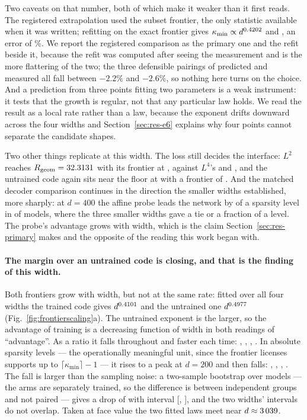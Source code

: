 \documentclass[preprint,12pt]{elsarticle}
\theoremstyle{definition}
\begin{document}
Two caveats on that number, both of which make it weaker than it first reads. The registered
extrapolation used the subset frontier, the only statistic available when it was written; refitting
on the exact frontier gives $\kappa_{\min}\propto d^{0.4202}$ and \ScPredicted{}, an error of
\ScPredErrorPct\%. We report the registered comparison as the primary one and the refit beside it,
because the refit was computed after seeing the measurement and is the more flattering of the two;
the three defensible pairings of predicted and measured all fall between $-2.2\%$ and $-2.6\%$, so
nothing here turns on the choice. And a prediction from three points fitting two parameters is a
weak instrument: it tests that the growth is regular, not that any particular law holds. We read the
result as a local rate rather than a law, because the exponent drifts downward across the four widths
and Section~\ref{sec:res-e6} explains why four points cannot separate the candidate shapes.

Two other things replicate at this width. The loss still decides the interface: $L^2$ reaches
$R_{\mathrm{geom}}=32.3131$ with its frontier at \ScLtwoKappa, against $L^4$'s
\ScLfourRgeom{} and \ScLfourKappa{}, and the untrained code again sits near the floor at
\ScRandRgeom{} with a frontier of \ScRandKappa{}. And the matched decoder comparison continues in the direction the smaller widths
established, more sharply: at $d=400$ the affine probe leads the network by \ScPrimDiff{} of a
sparsity level in \ScPrimProbeWins{} of \ScSeeds{} models, where the three smaller widths gave a tie
or a fraction of a level. The probe's advantage grows with width, which is the claim
Section~\ref{sec:res-primary} makes and the opposite of the reading this work began with.

\paragraph{The margin over an untrained code is closing, and that is the finding of this width.}
Both frontiers grow with width, but not at the same rate: fitted over all four widths the trained
code gives $d^{0.4101}$ and the untrained one $d^{0.4977}$
(Fig.~\ref{fig:frontierscaling}a). The untrained exponent is the larger, so the advantage of training
is a decreasing function of width in both readings of ``advantage''. As a ratio it falls throughout
and faster each time: \MarginFiftyRatio, \MarginHundredRatio, \MarginTwoHundredRatio,
\MarginFourHundredRatio. In absolute sparsity levels --- the operationally meaningful unit, since the
frontier licenses supports up to $\lceil\kappa_{\min}\rceil-1$ --- it rises to a peak at $d=200$ and
then falls: \MarginFiftyGap, \MarginHundredGap, \MarginTwoHundredGap, \MarginFourHundredGap. The fall
is larger than the sampling noise: a two-sample bootstrap over models --- the arms are separately
trained, so the difference is between independent groups and not paired --- gives a drop of
\MarginDrop{} with
interval [\MarginDropCiLow, \MarginDropCiHigh], and the two widths' intervals do not overlap. Taken
at face value the two fitted laws meet near $d\approx3\,039$.
\end{document}
